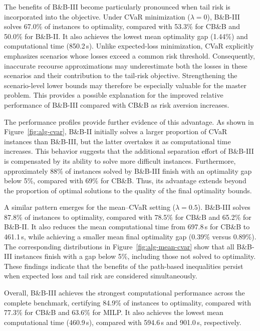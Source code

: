 \documentclass[a4paper,fleqn]{cas-sc}
\begin{document}
The benefits of B\&B-III become particularly pronounced when tail risk is incorporated into the objective. Under CVaR minimization ($\lambda=0$), B\&B-III solves 67.0\% of instances to optimality, compared with 53.3\% for CB\&B and 50.0\% for B\&B-II. It also achieves the lowest mean optimality gap (1.44\%) and computational time (850.2\,s). Unlike expected-loss minimization, CVaR explicitly emphasizes scenarios whose losses exceed a common risk threshold. Consequently, inaccurate recourse approximations may underestimate both the losses in these scenarios and their contribution to the tail-risk objective. Strengthening the scenario-level lower bounds may therefore be especially valuable for the master problem. This provides a possible explanation for the improved relative performance of B\&B-III compared with CB\&B as risk aversion increases.

The performance profiles provide further evidence of this advantage. As shown in Figure~\ref{fig:alg-cvar}, B\&B-II initially solves a larger proportion of CVaR instances than B\&B-III, but the latter overtakes it as computational time increases. This behavior suggests that the additional separation effort of B\&B-III is compensated by its ability to solve more difficult instances. Furthermore, approximately 88\% of instances solved by B\&B-III finish with an optimality gap below 5\%, compared with 69\% for CB\&B. Thus, its advantage extends beyond the proportion of optimal solutions to the quality of the final optimality bounds.

A similar pattern emerges for the mean--CVaR setting
($\lambda=0.5$). B\&B-III solves 87.8\% of instances to optimality, compared with 78.5\% for CB\&B and 65.2\% for B\&B-II. It also reduces the mean computational time from 697.8\,s for CB\&B to 461.1\,s, while achieving a smaller mean final optimality gap (0.39\% versus 0.89\%). The corresponding distributions in Figure~\ref{fig:alg-mean-cvar} show that all B\&B-III instances finish with a gap below 5\%, including those not solved to optimality. These findings indicate that the benefits of the path-based inequalities persist when expected loss and tail risk are considered simultaneously.

Overall, B\&B-III achieves the strongest computational
performance across the complete benchmark, certifying
84.9\% of instances to optimality, compared with
77.3\% for CB\&B and 63.6\% for MILP. It also
achieves the lowest mean computational time (460.9\,s),
compared with 594.6\,s and 901.0\,s, respectively.
\end{document}
